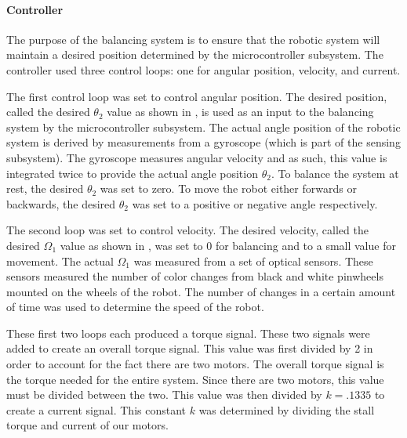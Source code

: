 \documentclass[11pt]{report}
\begin{document}
\begin{spacing}{1.5}
        \paragraph{Controller}
        
        The purpose of the balancing system is to ensure that the robotic system will maintain a desired position determined by the microcontroller subsystem. The controller used three control loops: one for angular position, velocity, and current. 
        
        The first control loop was set to control angular position.  The desired position, called the desired $\theta_2$ value as shown in \cite{Groff}, is used as an input to the balancing system by the microcontroller subsystem. The actual angle position of the robotic system is derived by measurements from a gyroscope (which is part of the sensing subsystem). The gyroscope measures angular velocity and as such, this value is integrated twice to provide the actual angle position $\theta_2$. To balance the system at rest, the desired $\theta_2$ was set to zero. To move the robot either forwards or backwards, the desired $\theta_2$ was set to a positive or negative angle respectively. 
        
        The second loop was set to control velocity.  The desired velocity, called the desired $\Omega_1$ value as shown in \cite{Groff}, was set to 0 for balancing and to a small value for movement.  The actual $\Omega_1$ was measured from a set of optical sensors.  These sensors measured the number of color changes from black and white pinwheels mounted on the wheels of the robot.  The number of changes in a certain amount of time was used to determine the speed of the robot.  
        
        These first two loops each produced a torque signal.  These two signals were added to create an overall torque signal.  This value was first divided by 2 in order to account for the fact there are two motors.  The overall torque signal is the torque needed for the entire system.  Since there are two motors, this value must be divided between the two.  This value was then divided by $k = .1335$ to create a current signal.  This constant $k$ was determined by dividing the stall torque and current of our motors.
        

\end{spacing}
\end{document}
